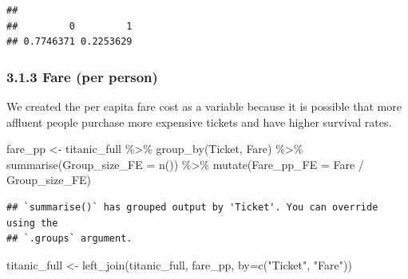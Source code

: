 \documentclass[
]{article}
\newenvironment{Shaded}{\begin{snugshade}}{\end{snugshade}}
\newcommand{\AttributeTok}[1]{\textcolor[rgb]{0.77,0.63,0.00}{#1}}
\newcommand{\FunctionTok}[1]{\textcolor[rgb]{0.00,0.00,0.00}{#1}}
\newcommand{\NormalTok}[1]{#1}
\newcommand{\OtherTok}[1]{\textcolor[rgb]{0.56,0.35,0.01}{#1}}
\newcommand{\SpecialCharTok}[1]{\textcolor[rgb]{0.00,0.00,0.00}{#1}}
\newcommand{\StringTok}[1]{\textcolor[rgb]{0.31,0.60,0.02}{#1}}
\begin{document}
\begin{verbatim}
## 
##         0         1 
## 0.7746371 0.2253629
\end{verbatim}

\hypertarget{fare-per-person}{%
\subsubsection{\texorpdfstring{\textbf{3.1.3 Fare (per
person)}}{3.1.3 Fare (per person)}}\label{fare-per-person}}

We created the per capita fare cost as a variable because it is possible
that more affluent people purchase more expensive tickets and have
higher survival rates.

\begin{Shaded}
\begin{Highlighting}[]
\NormalTok{fare\_pp }\OtherTok{\textless{}{-}}\NormalTok{ titanic\_full }\SpecialCharTok{\%\textgreater{}\%}
  \FunctionTok{group\_by}\NormalTok{(Ticket, Fare) }\SpecialCharTok{\%\textgreater{}\%}
  \FunctionTok{summarise}\NormalTok{(}\AttributeTok{Group\_size\_FE =} \FunctionTok{n}\NormalTok{()) }\SpecialCharTok{\%\textgreater{}\%}
  \FunctionTok{mutate}\NormalTok{(}\AttributeTok{Fare\_pp\_FE =}\NormalTok{ Fare }\SpecialCharTok{/}\NormalTok{ Group\_size\_FE)}
\end{Highlighting}
\end{Shaded}

\begin{verbatim}
## `summarise()` has grouped output by 'Ticket'. You can override using the
## `.groups` argument.
\end{verbatim}

\begin{Shaded}
\begin{Highlighting}[]
\NormalTok{titanic\_full }\OtherTok{\textless{}{-}} \FunctionTok{left\_join}\NormalTok{(titanic\_full, fare\_pp, }\AttributeTok{by=}\FunctionTok{c}\NormalTok{(}\StringTok{"Ticket"}\NormalTok{, }\StringTok{"Fare"}\NormalTok{))}
\end{Highlighting}
\end{Shaded}
\end{document}
